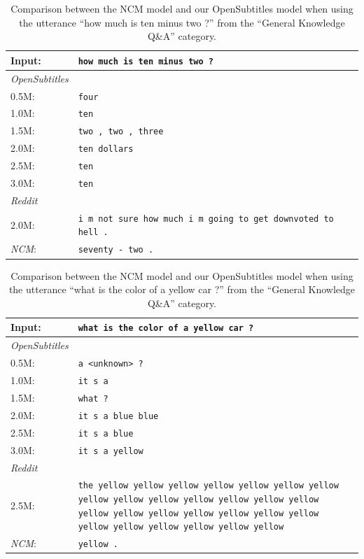 \begin{table}[H]
	\centering
	\begin{adjustbox}{max width=\textwidth}
		\begin{tabularx}{\textwidth}{lX}
			\toprule
			Input: 	& \texttt{how much is ten minus two ?}\\
			\midrule
			\emph{OpenSubtitles}\\
			0.5M: 	& \texttt{four}\\
			1.0M: 	& \texttt{ten}\\
			1.5M:	& \texttt{two , two , three}\\
			2.0M:	& \texttt{ten dollars}\\
			2.5M:	& \texttt{ten}\\
			3.0M:	& \texttt{ten}\\
			\midrule
			\emph{Reddit}\\
			2.0M:	& \texttt{i m not sure how much i m going to get downvoted to hell .}\\
			\midrule
			\emph{NCM}:	& \texttt{seventy - two .}\\
			\bottomrule
		\end{tabularx}
	\end{adjustbox}
	\caption{Comparison between the NCM model and our OpenSubtitles model when using the utterance ``how much is ten minus two ?'' from the ``General Knowledge Q\&A'' category.}
	\label{results:example11_output:Neural_Conversational_Model_compared}
\end{table}
\begin{table}[H]
	\centering
	\begin{adjustbox}{max width=\textwidth}
		\begin{tabularx}{\textwidth}{lX}
			\toprule
			Input: 	& \texttt{what is the color of a yellow car ?}\\
			\midrule
			\emph{OpenSubtitles}\\
			0.5M: 	& \texttt{a <unknown> ?}\\
			1.0M: 	& \texttt{it s a}\\
			1.5M:	& \texttt{what ?}\\
			2.0M:	& \texttt{it s a blue blue}\\
			2.5M:	& \texttt{it s a blue}\\
			3.0M:	& \texttt{it s a yellow}\\
			\midrule
			\emph{Reddit}\\
			2.5M:	& \texttt{the yellow yellow yellow yellow yellow yellow yellow yellow yellow yellow yellow yellow yellow yellow yellow yellow yellow yellow yellow yellow yellow yellow yellow yellow yellow yellow yellow}\\
					\midrule
			\emph{NCM}:	& \texttt{yellow .}\\
			\bottomrule
		\end{tabularx}
	\end{adjustbox}
	\caption{Comparison between the NCM model and our OpenSubtitles model when using the utterance ``what is the color of a yellow car ?'' from the ``General Knowledge Q\&A'' category.}
	\label{results:example12_output:Neural_Conversational_Model_compared}
\end{table}
